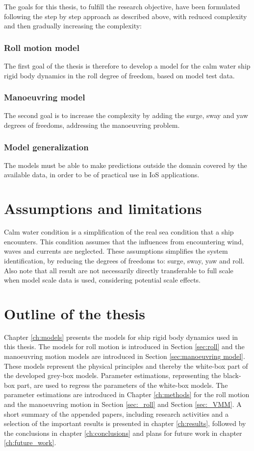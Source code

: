 \noindent 
The goals for this thesis, to fulfill the research objective, have been formulated following the step by step approach as described above, with reduced complexity and then gradually increasing the complexity:

\subsubsection*{Roll motion model}
The first goal of the thesis is therefore to develop a model for the calm water ship rigid body dynamics in the roll degree of freedom, based on model test data.

\subsubsection*{Manoeuvring model}
The second goal is to increase the complexity by adding the surge, sway and yaw degrees of freedoms, addressing the manoeuvring problem.

\subsubsection*{Model generalization}
The models must be able to make predictions outside the domain covered by the available data, in order to be of practical use in IoS applications.

\section{Assumptions and limitations}
Calm water condition is a simplification of the real sea condition that a ship encounters. This condition assumes that the influences from encountering wind, waves and currents are neglected. These assumptions simplifies the system identification, by reducing the degrees of freedoms to: surge, sway, yaw and roll. Also note that all result are not necessarily directly transferable to full scale when model scale data is used, considering potential scale effects. 

\section{Outline of the thesis}
Chapter \ref{ch:models} presents the models for ship rigid body dynamics used in this thesis. The models for roll motion is introduced in Section \ref{sec:roll} and the manoeuvring motion models are introduced in Section \ref{sec:manoeuvring model}. These models represent the physical principles and thereby the white-box part of the developed grey-box models.
Parameter estimations, representing the black-box part, are used to regress the parameters of the white-box models. The parameter estimations are introduced in Chapter \ref{ch:methods} for the roll motion and the manoeuvring motion in Section \ref{sec:_roll} and Section \ref{sec:_VMM}. 
A short summary of the appended papers, including research activities and a selection of the important results is presented in chapter \ref{ch:results}, followed by the conclusions in chapter \ref{ch:conclusions} and plans for future work in chapter \ref{ch:future_work}.